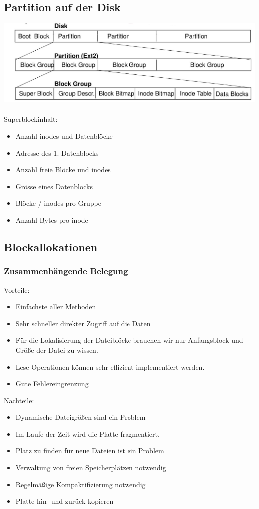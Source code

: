 \documentclass[a4paper, 10pt]{article}
\begin{document}
\subsection{Partition auf der Disk}
\includegraphics[scale=0.3]{Partition_HD.jpg}\\
\\
Superblockinhalt:
\begin{itemize}
\item Anzahl inodes und Datenblöcke
\item Adresse des 1. Datenblocks
\item Anzahl freie Blöcke und inodes
\item Grösse eines Datenblocks
\item Blöcke / inodes pro Gruppe
\item Anzahl Bytes pro inode
\end{itemize}

\subsection{Blockallokationen}
\subsubsection{Zusammenhängende Belegung}
Vorteile:
\begin{itemize}
\item Einfachste aller Methoden
\item Sehr schneller direkter Zugriff auf die Daten
\item Für die Lokalisierung der Dateiblöcke brauchen wir
nur Anfangsblock und Größe der Datei zu wissen.
\item Lese-Operationen können sehr effizient implementiert
werden.
\item Gute Fehlereingrenzung
\end{itemize}
Nachteile:
\begin{itemize}
\item Dynamische Dateigrößen sind ein Problem
\item Im Laufe der Zeit wird die Platte fragmentiert.
\item Platz zu finden für neue Dateien ist ein Problem
\item Verwaltung von freien Speicherplätzen notwendig
\item Regelmäßige Kompaktifizierung notwendig
\item Platte hin- und zurück kopieren
\end{itemize}
\end{document}

